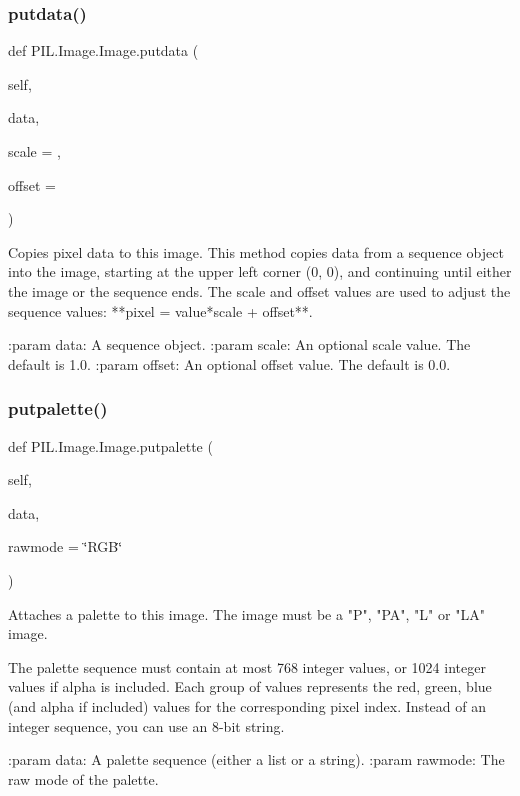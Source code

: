 \subsubsection{\texorpdfstring{putdata()}{putdata()}}
{\footnotesize\ttfamily def P\+I\+L.\+Image.\+Image.\+putdata (\begin{DoxyParamCaption}\item[{}]{self,  }\item[{}]{data,  }\item[{}]{scale = {},  }\item[{}]{offset = {} }\end{DoxyParamCaption})}

\begin{DoxyVerb}Copies pixel data to this image.  This method copies data from a
sequence object into the image, starting at the upper left
corner (0, 0), and continuing until either the image or the
sequence ends.  The scale and offset values are used to adjust
the sequence values: **pixel = value*scale + offset**.

:param data: A sequence object.
:param scale: An optional scale value.  The default is 1.0.
:param offset: An optional offset value.  The default is 0.0.
\end{DoxyVerb}
 \mbox{\label{classPIL_1_1Image_1_1Image_a422af86026c6e881f1274d13cc8cd8ca}} 
\subsubsection{\texorpdfstring{putpalette()}{putpalette()}}
{\footnotesize\ttfamily def P\+I\+L.\+Image.\+Image.\+putpalette (\begin{DoxyParamCaption}\item[{}]{self,  }\item[{}]{data,  }\item[{}]{rawmode = {\ttfamily \char`\"{}RGB\char`\"{}} }\end{DoxyParamCaption})}

\begin{DoxyVerb}Attaches a palette to this image.  The image must be a "P", "PA", "L"
or "LA" image.

The palette sequence must contain at most 768 integer values, or 1024
integer values if alpha is included. Each group of values represents
the red, green, blue (and alpha if included) values for the
corresponding pixel index. Instead of an integer sequence, you can use
an 8-bit string.

:param data: A palette sequence (either a list or a string).
:param rawmode: The raw mode of the palette.
\end{DoxyVerb}
 \mbox{\label{classPIL_1_1Image_1_1Image_ad07506275e6f2f42cfa1cce74c7a8066}} 
